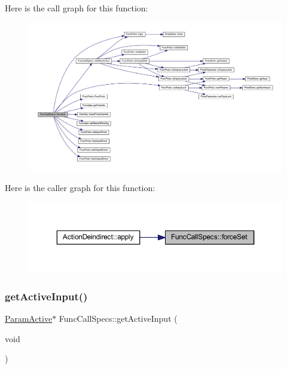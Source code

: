 Here is the call graph for this function\+:
\nopagebreak
\begin{figure}[H]
\begin{center}
\leavevmode
\includegraphics[width=350pt]{class_func_call_specs_a8bc0ef657c876530f21a6ae60458eb35_cgraph}
\end{center}
\end{figure}
Here is the caller graph for this function\+:
\nopagebreak
\begin{figure}[H]
\begin{center}
\leavevmode
\includegraphics[width=350pt]{class_func_call_specs_a8bc0ef657c876530f21a6ae60458eb35_icgraph}
\end{center}
\end{figure}
\mbox{\label{class_func_call_specs_a32432a6c7b201dc160ae0b2480a1b8b9}} 
\subsubsection{\texorpdfstring{getActiveInput()}{getActiveInput()}}
{\footnotesize\ttfamily \mbox{\hyperlink{class_param_active}{Param\+Active}}$\ast$ Func\+Call\+Specs\+::get\+Active\+Input (\begin{DoxyParamCaption}\item[{void}]{ }\end{DoxyParamCaption})\hspace{0.3cm}{\ttfamily [inline]}}



